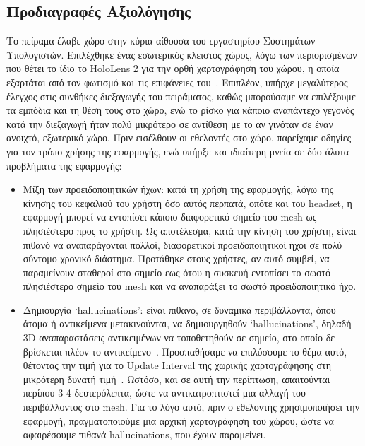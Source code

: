 \subsection{Προδιαγραφές Αξιολόγησης}\label{subsec:experimentSpecsForEvaluation}
Το πείραμα έλαβε χώρο στην κύρια αίθουσα του εργαστηρίου Συστημάτων Υπολογιστών. Επιλέχθηκε ένας εσωτερικός κλειστός χώρος, λόγω των περιορισμένων που θέτει το ίδιο το HoloLens 2 για την ορθή χαρτογράφηση του χώρου, η οποία εξαρτάται από τον φωτισμό και τις επιφάνειες του~\cite{mattzmsft_2023_spatial}. Επιπλέον, υπήρχε μεγαλύτερος έλεγχος στις συνθήκες διεξαγωγής του πειράματος, καθώς μπορούσαμε να επιλέξουμε τα εμπόδια και τη θέση τους στο χώρο, ενώ το ρίσκο για κάποιο αναπάντεχο γεγονός κατά την διεξαγωγή ήταν πολύ μικρότερο σε αντίθεση με το αν γινόταν σε έναν ανοιχτό, εξωτερικό χώρο.
Πριν εισέλθουν οι εθελοντές στο χώρο, παρείχαμε οδηγίες για τον τρόπο χρήσης της εφαρμογής, ενώ υπήρξε και ιδιαίτερη μνεία σε δύο άλυτα προβλήματα της εφαρμογής:
\begin{itemize}
    \item Μίξη των προειδοποιητικών ήχων: κατά τη χρήση της εφαρμογής, λόγω της κίνησης του κεφαλιού του χρήστη όσο αυτός περπατά, οπότε και του headset, η εφαρμογή μπορεί να εντοπίσει κάποιο διαφορετικό σημείο του mesh ως πλησιέστερο προς το χρήστη. Ως αποτέλεσμα, κατά την κίνηση του χρήστη, είναι πιθανό να αναπαράγονται πολλοί, διαφορετικοί προειδοποιητικοί ήχοι σε πολύ σύντομο χρονικό διάστημα. Προτάθηκε στους χρήστες, αν αυτό συμβεί, να παραμείνουν σταθεροί στο σημείο εως ότου η συσκευή εντοπίσει το σωστό πλησιέστερο σημείο του mesh και να αναπαράξει το σωστό προειδοποιητικό ήχο.
    \item Δημιουργία `hallucinations': είναι πιθανό, σε δυναμικά περιβάλλοντα, όπου άτομα ή αντικείμενα μετακινούνται, να δημιουργηθούν `hallucinations', δηλαδή 3D αναπαραστάσεις αντικειμένων να τοποθετηθούν σε σημείο, στο οποίο δε βρίσκεται πλέον το αντικείμενο~\cite{mattzmsft_2023_spatial}. Προσπαθήσαμε να επιλύσουμε το θέμα αυτό, θέτοντας την τιμή για το Update Interval της χωρικής χαρτογράφησης στη μικρότερη δυνατή τιμή~\cite{davidklinems_2022_configuring}. Ωστόσο, και σε αυτή την περίπτωση, απαιτούνται περίπου 3-4 δευτερόλεπτα, ώστε να αντικατροπτιστεί μια αλλαγή του περιβάλλοντος στο mesh. Για το λόγο αυτό, πριν ο εθελοντής χρησιμοποιήσει την εφαρμογή, πραγματοποιούμε μια αρχική χαρτογράφηση του χώρου, ώστε να αφαιρέσουμε πιθανά hallucinations, που έχουν παραμείνει. %
\end{itemize}

